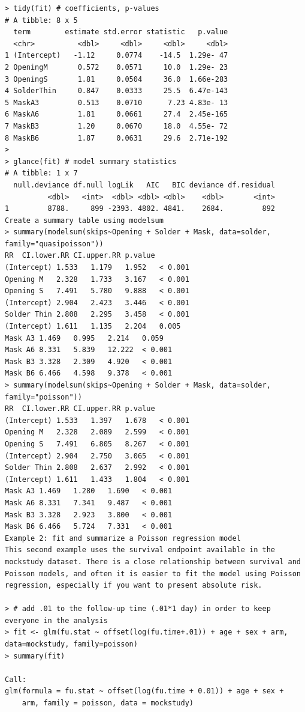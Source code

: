 \documentclass[
]{book}
\begin{document}
\begin{verbatim}
> tidy(fit) # coefficients, p-values
# A tibble: 8 x 5
  term        estimate std.error statistic   p.value
  <chr>          <dbl>     <dbl>     <dbl>     <dbl>
1 (Intercept)   -1.12     0.0774    -14.5  1.29e- 47
2 OpeningM       0.572    0.0571     10.0  1.29e- 23
3 OpeningS       1.81     0.0504     36.0  1.66e-283
4 SolderThin     0.847    0.0333     25.5  6.47e-143
5 MaskA3         0.513    0.0710      7.23 4.83e- 13
6 MaskA6         1.81     0.0661     27.4  2.45e-165
7 MaskB3         1.20     0.0670     18.0  4.55e- 72
8 MaskB6         1.87     0.0631     29.6  2.71e-192
> 
> glance(fit) # model summary statistics
# A tibble: 1 x 7
  null.deviance df.null logLik   AIC   BIC deviance df.residual
          <dbl>   <int>  <dbl> <dbl> <dbl>    <dbl>       <int>
1         8788.     899 -2393. 4802. 4841.    2684.         892
Create a summary table using modelsum
> summary(modelsum(skips~Opening + Solder + Mask, data=solder, family="quasipoisson"))
RR  CI.lower.RR CI.upper.RR p.value
(Intercept) 1.533   1.179   1.952   < 0.001
Opening M   2.328   1.733   3.167   < 0.001
Opening S   7.491   5.780   9.888   < 0.001
(Intercept) 2.904   2.423   3.446   < 0.001
Solder Thin 2.808   2.295   3.458   < 0.001
(Intercept) 1.611   1.135   2.204   0.005
Mask A3 1.469   0.995   2.214   0.059
Mask A6 8.331   5.839   12.222  < 0.001
Mask B3 3.328   2.309   4.920   < 0.001
Mask B6 6.466   4.598   9.378   < 0.001
> summary(modelsum(skips~Opening + Solder + Mask, data=solder, family="poisson"))
RR  CI.lower.RR CI.upper.RR p.value
(Intercept) 1.533   1.397   1.678   < 0.001
Opening M   2.328   2.089   2.599   < 0.001
Opening S   7.491   6.805   8.267   < 0.001
(Intercept) 2.904   2.750   3.065   < 0.001
Solder Thin 2.808   2.637   2.992   < 0.001
(Intercept) 1.611   1.433   1.804   < 0.001
Mask A3 1.469   1.280   1.690   < 0.001
Mask A6 8.331   7.341   9.487   < 0.001
Mask B3 3.328   2.923   3.800   < 0.001
Mask B6 6.466   5.724   7.331   < 0.001
Example 2: fit and summarize a Poisson regression model
This second example uses the survival endpoint available in the mockstudy dataset. There is a close relationship between survival and Poisson models, and often it is easier to fit the model using Poisson regression, especially if you want to present absolute risk.

> # add .01 to the follow-up time (.01*1 day) in order to keep everyone in the analysis
> fit <- glm(fu.stat ~ offset(log(fu.time+.01)) + age + sex + arm, data=mockstudy, family=poisson)
> summary(fit)

Call:
glm(formula = fu.stat ~ offset(log(fu.time + 0.01)) + age + sex + 
    arm, family = poisson, data = mockstudy)


\end{verbatim}
\end{document}
